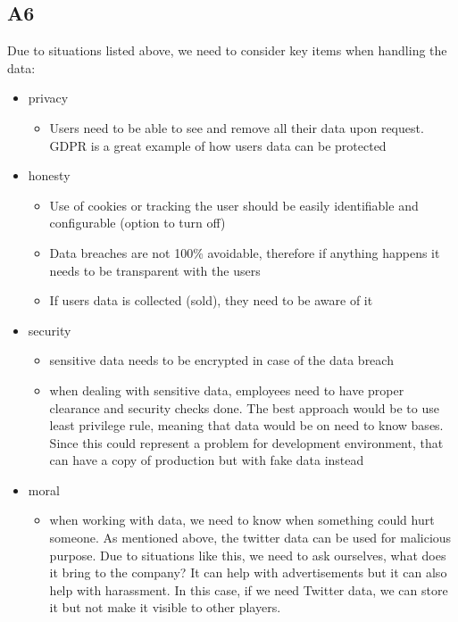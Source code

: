 \subsection{A6}\label{A6}

Due to situations listed above, we need to consider key items when handling the data:
\begin{itemize}
    \item privacy
    \begin{itemize}
        \item Users need to be able to see and remove all their data upon request. GDPR \parencite{voigt2017eu} is a great example of how users data can be protected
    \end{itemize}

    \item honesty
    \begin{itemize}
        \item Use of cookies or tracking the user should be easily identifiable and configurable (option to turn off) \parencite{englehardt2015cookies}
        \item Data breaches are not 100\% avoidable, therefore if anything happens it needs to be transparent with the users \parencite{sen2015estimating}
        \item If users data is collected (sold), they need to be aware of it
    \end{itemize}

    \item security
    \begin{itemize}
        \item sensitive data needs to be encrypted in case of the data breach \parencite{smid1988data}
        \item when dealing with sensitive data, employees need to have proper clearance and security checks done. The best approach would be to use least privilege rule, meaning that data would be on need to know bases. Since this could represent a problem for development environment, that can have a copy of production but with fake data instead
    \end{itemize}

    \item moral
    \begin{itemize}
        \item when working with data, we need to know when something could hurt someone. As mentioned above, the twitter data can be used for malicious purpose. Due to situations like this, we need to ask ourselves, what does it bring to the company? It can help with advertisements but it can also help with harassment. In this case, if we need Twitter data, we can store it but not make it visible to other players.
    \end{itemize}
\end{itemize}
